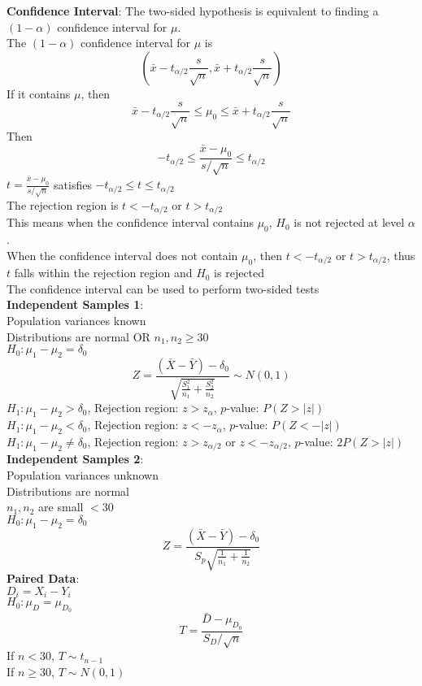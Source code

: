 \documentclass{article}
\begin{document}
\begin{multicols*}{3}
\textbf{Confidence Interval}: The two-sided hypothesis is equivalent to finding a $(1-\alpha)$ confidence interval for $\mu$. \\
The $(1-\alpha)$ confidence interval for $\mu$ is $$(\bar{x}-t_{\alpha/2}\frac{s}{\sqrt{n}},\bar{x}+t_{\alpha/2}\frac{s}{\sqrt{n}})$$
If it contains $\mu$, then $$\bar{x}-t_{\alpha/2}\frac{s}{\sqrt{n}}\leq \mu_0\leq\bar{x}+t_{\alpha/2}\frac{s}{\sqrt{n}}$$
Then $$-t_{\alpha/2}\leq\frac{\bar{x}-\mu_0}{s/\sqrt{n}}\leq t_{\alpha/2}$$
$t=\frac{\bar{x}-\mu_0}{s/\sqrt{n}}$ satisfies $-t_{\alpha/2}\leq t\leq t_{\alpha/2}$\\
The rejection region is $t<-t_{\alpha/2}$ or $t>t_{\alpha/2}$\\
This means when the confidence interval contains $\mu_0$, $H_0$ is not rejected at level $\alpha$. \\
When the confidence interval does not contain $\mu_0$, then $t<-t_{\alpha/2}$ or $t>t_{\alpha/2}$, thus $t$ falls within the rejection region and $H_0$ is rejected \\
The confidence interval can be used to perform two-sided tests\\
\textbf{Independent Samples 1}:\\
Population variances known\\
Distributions are normal OR $n_1,n_2\geq 30$\\
$H_0:\mu_1-\mu_2=\delta_0$\\
$$Z=\frac{(\bar{X}-\bar{Y})-\delta_0}{\sqrt{\frac{S_1^2}{n_1}+\frac{S_2^2}{n_2}}}\sim N(0,1)$$
$H_1:\mu_1-\mu_2>\delta_0$, Rejection region: $z>z_\alpha$, $p$-value: $P(Z>|z|)$\\
$H_1:\mu_1-\mu_2<\delta_0$, Rejection region: $z<-z_\alpha$, $p$-value: $P(Z<-|z|)$\\
$H_1:\mu_1-\mu_2\not=\delta_0$, Rejection region: $z>z_{\alpha/2}$ or $z<-z_{\alpha/2}$, $p$-value: $2P(Z>|z|)$\\
\textbf{Independent Samples 2}: \\
Population variances unknown\\
Distributions are normal\\
$n_1,n_2$ are small $<30$\\
$H_0:\mu_1-\mu_2=\delta_0$\\
$$Z=\frac{(\bar{X}-\bar{Y})-\delta_0}{S_p\sqrt{\frac{1}{n_1}+\frac{1}{n_2}}}$$
\textbf{Paired Data}:\\
$D_i=X_i-Y_i$\\
$H_0:\mu_D=\mu_{D_0}$\\
$$T=\frac{\bar{D}-\mu_{D_0}}{S_D/\sqrt{n}}$$
If $n<30$, $T\sim t_{n-1}$\\
If $n\geq30$, $T\sim N(0,1)$

\end{multicols*}
\end{document}
